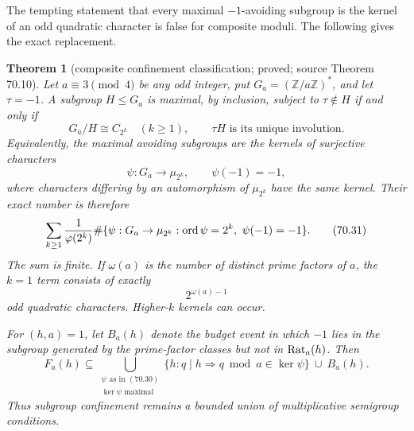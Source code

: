 \documentclass[10pt,reqno]{amsart}
\newtheorem{theorem}{Theorem}[section]
\theoremstyle{definition}
\newcommand{\1}{\mathbf 1}
\begin{document}
The tempting statement that every maximal $-1$-avoiding subgroup is the
kernel of an odd quadratic character is false for composite moduli.  The
following gives the exact replacement.

\begin{theorem}[composite confinement classification; proved; source Theorem 70.10]\label{thm:composite-confinement}  Let
$a\equiv3\pmod4$ be any odd integer, put
$G_a=({\mathbb Z}/a{\mathbb Z})^*$, and let $\tau=-1$.  A subgroup
$H\leq G_a$ is maximal, by inclusion, subject to $\tau\notin H$ if and
only if
\begin{equation}
 G_a/H\cong C_{2^k}\quad(k\geq1),
 \qquad \tau H\text{ is its unique involution}.           \tag{70.29}
\end{equation}
Equivalently, the maximal avoiding subgroups are the kernels of surjective
characters
\begin{equation}
        \psi:G_a\longrightarrow\mu_{2^k},
        \qquad \psi(-1)=-1,                               \tag{70.30}
\end{equation}
where characters differing by an automorphism of $\mu_{2^k}$ have the
same kernel.  Their exact number is therefore
\begin{equation}
 \sum_{k\geq1}{1\over\varphi(2^k)}
 \#\{\psi:G_a\to\mu_{2^k}:\operatorname {ord}\psi=2^k,
                                      \ \psi(-1)=-1\}.     \tag{70.31}
\end{equation}
The sum is finite.  If $\omega(a)$ is the number of distinct prime
factors of $a$, the $k=1$ term consists of exactly
\begin{equation}
                         2^{\omega(a)-1}                  \tag{70.32}
\end{equation}
odd quadratic characters.  Higher-$k$ kernels can occur.

For $(h,a)=1$, let $B_a(h)$ denote the budget event in which $-1$
lies in the subgroup generated by the prime-factor classes but not in
${\rm Rat}_a(h)$.  Then
\begin{equation}
 F_a(h)\subseteq
 \bigcup_{\substack{\psi\text{ as in }(70.30)\\
                    \ker\psi\text{ maximal}}}
 \{h:q\mid h\Rightarrow q\bmod a\in\ker\psi\}
       \ \cup\ B_a(h).                                    \tag{70.33}
\end{equation}
Thus subgroup confinement remains a bounded union of multiplicative
semigroup conditions.

\end{theorem}
\end{document}
